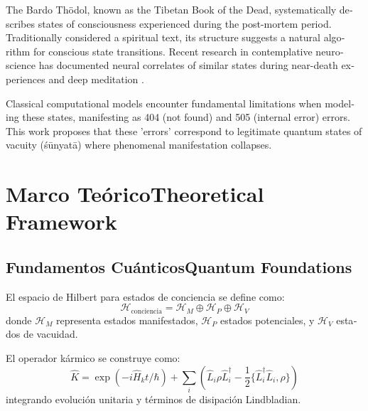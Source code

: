 \documentclass[12pt,a4paper]{article}
\newcommand{\es}[1]{\foreignlanguage{spanish}{#1}}
\newcommand{\en}[1]{\foreignlanguage{english}{#1}}
\begin{document}
\begin{otherlanguage}{english}
The Bardo Thödol, known as the Tibetan Book of the Dead, systematically describes states of consciousness experienced during the post-mortem period. Traditionally considered a spiritual text, its structure suggests a natural algorithm for conscious state transitions. Recent research in contemplative neuroscience has documented neural correlates of similar states during near-death experiences and deep meditation \cite{lutz2004, wallace2007}.

Classical computational models encounter fundamental limitations when modeling these states, manifesting as 404 (not found) and 505 (internal error) errors. This work proposes that these 'errors' correspond to legitimate quantum states of vacuity (śūnyatā) where phenomenal manifestation collapses.
\end{otherlanguage}

\section{\es{Marco Teórico}\en{Theoretical Framework}}

\subsection{\es{Fundamentos Cuánticos}\en{Quantum Foundations}}

\begin{otherlanguage}{spanish}
El espacio de Hilbert para estados de conciencia se define como:
\begin{equation}
\mathcal{H}_{\text{conciencia}} = \mathcal{H}_M \oplus \mathcal{H}_P \oplus \mathcal{H}_V
\end{equation}
donde $\mathcal{H}_M$ representa estados manifestados, $\mathcal{H}_P$ estados potenciales, y $\mathcal{H}_V$ estados de vacuidad.

El operador kármico se construye como:
\begin{equation}
\hat{K} = \exp\left(-i\hat{H}_k t/\hbar\right) + \sum_i \left(\hat{L}_i \rho \hat{L}_i^\dagger - \frac{1}{2}\{\hat{L}_i^\dagger \hat{L}_i, \rho\}\right)
\end{equation}
integrando evolución unitaria y términos de disipación Lindbladian. \cite{hameroff2014, zurek2003}
\end{otherlanguage}
\end{document}
